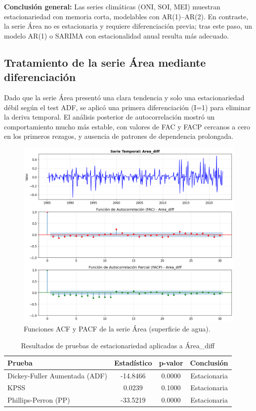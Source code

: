 \textbf{Conclusión general:} Las series climáticas (ONI, SOI, MEI) muestran 
estacionariedad con memoria corta, modelables con AR(1)–AR(2). En contraste, la serie 
Área no es estacionaria y requiere diferenciación previa; tras este paso, un modelo AR(1) 
o SARIMA con estacionalidad anual resulta más adecuado.

\subsection{Tratamiento de la serie Área mediante diferenciación}

Dado que la serie Área presentó una clara tendencia y solo una estacionariedad débil según 
el test ADF, se aplicó una primera diferenciación (I=1) para eliminar la deriva temporal. 
El análisis posterior de autocorrelación mostró un comportamiento mucho más estable, con 
valores de FAC y FACP cercanos a cero en los primeros rezagos, y ausencia de patrones de 
dependencia prolongada.

\begin{figure}[H]
    \centering
    \includegraphics[scale=.42]{Figures/facp_Area_dif.png}
    \caption{Funciones ACF y PACF de la serie Área (superficie de agua).}
    \label{fig:facp_area_dif}
\end{figure}

\begin{table}[H]
    \centering
    \caption{Resultados de pruebas de estacionariedad aplicadas a Área\_diff}
    \label{tab:ru_area_diff}
    \begin{tabular}{lccc}
        \toprule
        \textbf{Prueba} & \textbf{Estadístico} & \textbf{p-valor} & \textbf{Conclusión} \\
        \midrule
        Dickey-Fuller Aumentada (ADF) & -14.8466 & 0.0000 & Estacionaria \\
        KPSS & 0.0239 & 0.1000 & Estacionaria \\
        Phillips-Perron (PP) & -33.5219 & 0.0000 & Estacionaria \\
        \bottomrule
    \end{tabular}
\end{table}

